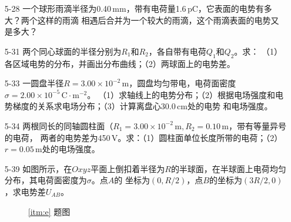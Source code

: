 \documentclass[UTF-8]{ctexart}
\makeatletter
\newcommand\mlabel[2]{#2\def\@currentlabel{#2}\label{#1}}
\makeatother
\begin{document}
\begin{enumerate}
    \item[5-28] 一个球形雨滴半径为0.40\,mm，带有电荷量1.6\,pC，它表面的电势有多大？两个这样的雨滴
        相遇后合并为一个较大的雨滴，这个雨滴表面的电势又是多大？

    \item[5-31] 两个同心球面的半径分别为\(R_1\)和\(R_2\)，各自带有电荷\(Q_1\)和\(Q_2\)。求：
        （1）各区域电势的分布，并画出分布曲线；（2）两球面上的电势差。
    
    \item[5-33] 一圆盘半径\(R=3.00\times10^{-2}\, \mathrm{m}\)，圆盘均匀带电，电荷面密度\(\sigma=2.00\times10^{-5}\,\mathrm{C\cdot m^{-2}}\)。
        （1）求轴线上的电势分布；（2）根据电场强度和电势梯度的关系求电场分布；（3）计算离盘心30.0\,cm处的电势
        和电场强度。
    
    \item[5-34] 两根同长的同轴圆柱面（\(R_1=3.00\times10^{-2}\, \mathrm{m}, R_2=0.10\,\mathrm{m}\)，带有等量异号的电荷，
        两者的电势差为450\,V。求：（1）圆柱面单位长度所带的电荷；（2）\(r=0.05\,\mathrm{m}\)处的电场强度。
    
    \item[\mlabel{itm:e}{5-39}] 如图所示，在\(Oxyz\)平面上倒扣着半径为\(R\)的半球面，在半球面上电荷均匀分布，其电荷面密度为\(\sigma\)。点\(A\)的
        坐标为\((0,R/2)\)，点\(B\)的坐标为\((3R/2,0)\)，求电势差\(U_{AB}\)。
        \begin{figure}[htbp]
            \centering
            \begin{minipage}[b]{0.4\textwidth}
                \centering
                \caption{\ref{itm:e} 题图}
            \end{minipage}
        \end{figure}
    

\end{enumerate}
\end{document}
